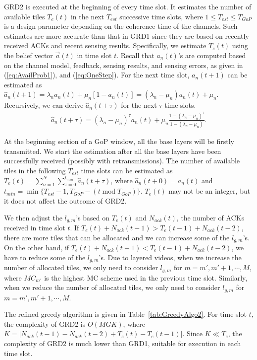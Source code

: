 \documentclass[12pt,onecolumn,draftclsnofoot]{IEEEtran} %
\begin{document}
GRD2 is executed at the beginning of every time slot.  It estimates the number of available tiles $T_e(t)$ in the next $T_{est}$ successive time slots, where $1 \le T_{est}\le T_{GoP}$ is a design parameter depending on the coherence time of the channels. Such estimates are more accurate than that in GRD1 since they are based on recently received ACKs and recent sensing results.  Specifically, we estimate $T_e(t)$ using the belief vector $\vec{a}(t)$ in time slot $t$. Recall that $a_n(t)$'s are computed based on the channel model, feedback, sensing results, and sensing errors, as given in (\ref{eq:AvailProb1}), and (\ref{eq:OneStep}). For the next time slot, $a_n(t+1)$ can be estimated as $\hat{a}_n(t+1) = \lambda_n a_n(t) + \mu_n [1-a_n(t)] = (\lambda_n-\mu_n) a_n(t)+\mu_n$.  Recursively, we can derive $\hat{a}_n(t+\tau)$ for the next $\tau$ time slots.
\begin{eqnarray}
  \hat{a}_n(t+\tau) = (\lambda_n-\mu_n)^\tau a_n(t)+ %
  \mu_n \frac{1-(\lambda_n-\mu_n)^\tau}{1-(\lambda_n-\mu_n)}.
\end{eqnarray}

At the beginning section of a GoP window, all the base layers will be firstly transmitted. We start the estimation after all the base layers have been successfully received (possibly with retransmissions). The number of available tiles in the following $T_{est}$ time slots can be 
estimated as $T_e(t) = \sum_{n=1}^N\sum_{\tau=0}^{t_{min}}\hat{a}_n(t+\tau)$, where $\hat{a}_n(t+0)=a_n(t)$ and $t_{min}=\min\{T_{est}-1,T_{GoP} - (t \; \mbox{mod} \; T_{GoP})\}$.  $T_e(t)$ may not be an integer, but it does not affect the outcome of GRD2.  

We then adjust the $l_{g,m}$'s based on $T_e(t)$ and $N_{ack}(t)$, the number of ACKs received in time slot $t$.  If $T_e(t)+N_{ack}(t-1) > T_e(t-1)+N_{ack}(t-2)$, there are more tiles that can be allocated and we can increase some of the $l_{g,m}$'s. On the other hand, if $T_e(t)+N_{ack}(t-1) < T_e(t-1)+N_{ack}(t-2)$, we have to reduce some of the $l_{g,m}$'s.  Due to layered videos, when we increase the number of allocated tiles, we only need to consider $l_{g,m}$ for $m=m', m'+1, \cdots, M$, where $MC_{m'}$ is the highest MC scheme used in the previous time slot.  Similarly, when we reduce the number of allocated tiles, we only need to consider $l_{g,m}$ for $m=m',m'+1,\cdots,M$. 

The refined greedy algorithm is given in Table~\ref{tab:GreedyAlgo2}. For time slot $t$, the complexity of GRD2 is $O(MGK)$, where $K = | N_{ack}(t-1) - N_{ack}(t-2) + T_e(t)-T_e(t-1) |$.  Since $K \ll T_e$, the complexity of GRD2 is much lower than GRD1, suitable for execution in each time slot.
\end{document}
